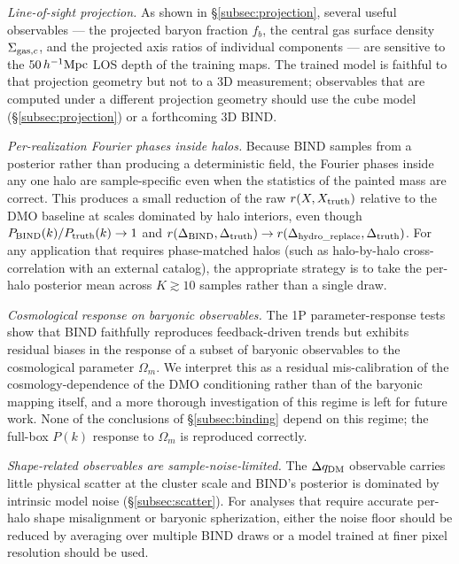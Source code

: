 \documentclass[linenumbers,trackchanges, twocolumn]{aastex701}
\begin{document}
\emph{Line-of-sight projection.} As shown in \S\ref{subsec:projection}, several useful observables --- the projected baryon fraction $f_b$, the central gas surface density $\Sigma_{{\rm gas},c}$, and the projected axis ratios of individual components --- are sensitive to the $50\,h^{-1}{\rm Mpc}$ LOS depth of the training maps. The trained model is faithful to that projection geometry but not to a 3D measurement; observables that are computed under a different projection geometry should use the cube model (\S\ref{subsec:projection}) or a forthcoming 3D \textsc{BIND}.

\emph{Per-realization Fourier phases inside halos.} Because \textsc{BIND} samples from a posterior rather than producing a deterministic field, the Fourier phases inside any one halo are sample-specific even when the statistics of the painted mass are correct. This produces a small reduction of the raw $r(X,X_{\rm truth})$ relative to the DMO baseline at scales dominated by halo interiors, even though $P_{\rm BIND}(k)/P_{\rm truth}(k)\to 1$ and $r(\Delta_{\rm BIND},\Delta_{\rm truth})\to r(\Delta_{\rm hydro\_replace},\Delta_{\rm truth})$. For any application that requires phase-matched halos (such as halo-by-halo cross-correlation with an external catalog), the appropriate strategy is to take the per-halo posterior mean across $K\gtrsim 10$ samples rather than a single draw.

\emph{Cosmological response on baryonic observables.} The 1P parameter-response tests show that \textsc{BIND} faithfully reproduces feedback-driven trends but exhibits residual biases in the response of a subset of baryonic observables to the cosmological parameter $\Omega_m$. We interpret this as a residual mis-calibration of the cosmology-dependence of the DMO conditioning rather than of the baryonic mapping itself, and a more thorough investigation of this regime is left for future work. None of the conclusions of \S\ref{subsec:binding} depend on this regime; the full-box $P(k)$ response to $\Omega_m$ is reproduced correctly.

\emph{Shape-related observables are sample-noise-limited.} The $\Delta q_{\rm DM}$ observable carries little physical scatter at the cluster scale and \textsc{BIND}'s posterior is dominated by intrinsic model noise (\S\ref{subsec:scatter}). For analyses that require accurate per-halo shape misalignment or baryonic spherization, either the noise floor should be reduced by averaging over multiple \textsc{BIND} draws or a model trained at finer pixel resolution should be used.
\end{document}
